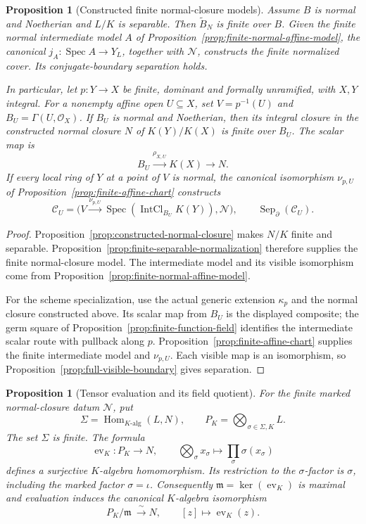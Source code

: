 \documentclass[11pt]{article}
\newtheorem{proposition}[theorem]{Proposition}
\theoremstyle{definition}
\theoremstyle{remark}
\DeclareMathOperator{\Spec}{Spec}
\begin{document}
\begin{proposition}[Constructed finite normal-closure models]
\label{prop:finite-normal-closure-model}
Assume \(B\) is normal and Noetherian and \(L/K\) is separable.
Then \(\widetilde B_N\) is finite over \(B\). Given the finite
normal intermediate model \(A\) of
Proposition~\ref{prop:finite-normal-affine-model}, the canonical
\(j_A:\Spec A\to Y_L\), together with \(\mathcal N\), constructs
the finite normalized cover. Its conjugate-boundary separation holds.

In particular, let \(p:Y\to X\) be finite, dominant and formally
unramified, with \(X,Y\) integral. For a nonempty affine open
\(U\subseteq X\), set \(V=p^{-1}(U)\) and
\(B_U=\Gamma(U,\mathcal O_X)\). If \(B_U\) is normal and
Noetherian, then its integral closure in the constructed normal
closure \(N\) of \(K(Y)/K(X)\) is finite over \(B_U\).
The scalar map is
\[
  B_U\xrightarrow{\rho_{X,U}}K(X)\longrightarrow N.
\]
If every local ring of \(Y\) at a point of \(V\) is normal,
the canonical isomorphism \(\nu_{p,U}\) of
Proposition~\ref{prop:finite-affine-chart} constructs
\[
  \mathcal C_U=
  \bigl(V\xrightarrow{\nu_{p,U}}
    \Spec(\operatorname{IntCl}_{B_U}K(Y)),\mathcal N\bigr),
  \qquad \operatorname{Sep}_{\partial}(\mathcal C_U).
\]
\end{proposition}

\begin{proof}
Proposition~\ref{prop:constructed-normal-closure} makes \(N/K\)
finite and separable. Proposition~\ref{prop:finite-separable-normalization}
therefore supplies the finite normal-closure model. The intermediate
model and its visible isomorphism come from
Proposition~\ref{prop:finite-normal-affine-model}.

For the scheme specialization, use the actual generic extension
\(\kappa_p\) and the normal closure constructed above. Its scalar
map from \(B_U\) is the displayed composite; the germ square of
Proposition~\ref{prop:finite-function-field} identifies the
intermediate scalar route with pullback along \(p\).
Proposition~\ref{prop:finite-affine-chart} supplies the finite
intermediate model and \(\nu_{p,U}\). Each visible map is an isomorphism,
so Proposition~\ref{prop:full-visible-boundary} gives separation.
\end{proof}

\begin{proposition}[Tensor evaluation and its field quotient]
\label{prop:normal-closure-tensor}
For the finite marked normal-closure datum \(\mathcal N\), put
\[
  \Sigma=\operatorname{Hom}_{K\text{-alg}}(L,N),
  \qquad P_K=\bigotimes_{\sigma\in\Sigma,K}L.
\]
The set \(\Sigma\) is finite. The formula
\[
  \operatorname{ev}_K:P_K\longrightarrow N,
  \qquad \bigotimes_{\sigma}x_\sigma
       \longmapsto\prod_{\sigma}\sigma(x_\sigma)
\]
defines a surjective \(K\)-algebra homomorphism. Its restriction to the
\(\sigma\)-factor is \(\sigma\), including the marked factor
\(\sigma=\iota\). Consequently
\(\mathfrak m=\ker(\operatorname{ev}_K)\) is maximal and evaluation
induces the canonical \(K\)-algebra isomorphism
\[
  P_K/\mathfrak m\ \xrightarrow{\ \sim\ }N,
  \qquad [z]\longmapsto\operatorname{ev}_K(z).
\]
\end{proposition}
\end{document}

